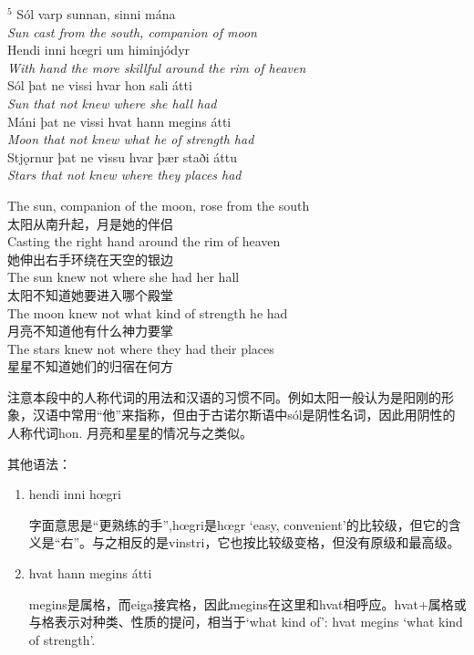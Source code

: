 \begin{paracol}{2}
    \noindent
    $^5 $ Sól varp sunnan, sinni mána\\
    \textit{Sun cast from the south, companion of moon}\\
    Hendi inni hœgri um himinjódyr\\
    \textit{With hand the more skillful around the rim of heaven}\\
    Sól þat ne vissi hvar hon sali átti\\
    \textit{Sun that not knew where she hall had}\\
    Máni þat ne vissi hvat hann megins átti\\
    \textit{Moon that not knew what he of strength had}\\
    Stjǫrnur þat ne vissu hvar þær staði áttu\\
    \textit{Stars that not knew where they places had}\\

    \switchcolumn

    \noindent
    The sun, companion of the moon, rose from the south\\
    太阳从南升起，月是她的伴侣\\
    Casting the right hand around the rim of heaven  \\
    她伸出右手环绕在天空的银边\\
    The sun knew not where she had her hall\\
    太阳不知道她要进入哪个殿堂\\
    The moon knew not what kind of strength he had\\
    月亮不知道他有什么神力要掌\\
    The stars knew not where they had their places\\
    星星不知道她们的归宿在何方\\

\end{paracol}
\begin{grammar*}{}
    注意本段中的人称代词的用法和汉语的习惯不同。例如太阳一般认为是阳刚的形象，汉语中常用“他”来指称，但由于古诺尔斯语中sól是阴性名词，因此用阴性的人称代词hon. 月亮和星星的情况与之类似。

    其他语法：
    \begin{enumerate}
        \item hendi inni hœgri

              字面意思是“更熟练的手”,hœgri是hœgr `easy, convenient'的比较级，但它的含义是“右”。与之相反的是vinstri，它也按比较级变格，但没有原级和最高级。

        \item hvat hann megins átti

              megins是属格，而eiga接宾格，因此megins在这里和hvat相呼应。hvat+属格或与格表示对种类、性质的提问，相当于`what kind of': hvat megins `what kind of strength'.
    \end{enumerate}
\end{grammar*}
\hspace*{\fill}\\ %

